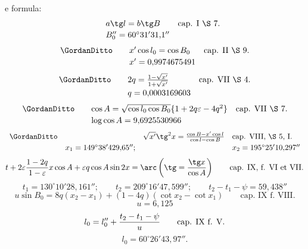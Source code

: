 \begingroup\small
e formula:
\[
\begin{array}{rcll}
&& a\tg l=b\tg B&\text{cap. I \S\ 7.}\vspace{0.2em}\\
&& B_0''=60^\circ31'31{,}1''&
\end{array}
\]
\[
\begin{array}{rcll}
\GordanDitto&& x'\cos l_0=\cos B_0&\text{cap. II \S\ 9.}\vspace{0.2em}\\
&& x'=0{,}9974675491&
\end{array}
\]
\[
\begin{array}{rcll}
\GordanDitto&&2q={1-\sqrt{x'}\over1+\sqrt{x'}}&\text{cap. VII \S\ 4.}\vspace{0.2em}\\
&&q=0{,}0003169603&
\end{array}
\]
\[
\begin{array}{rcll}
\GordanDitto&&\cos A=\sqrt{\cos l_0\cos B_0}\{1+2q\varepsilon-4q^2\}&\text{cap. VII \S\ 7.}\vspace{0.2em}\\
&&\log\cos A=9{,}6925530966&
\end{array}
\]
\[
\begin{array}{rcll}
\GordanDitto&&\sqrt{x'}\tg^2x={\cos B-x'\cos l\over\cos l-\cos B}&\text{cap. VIII, \S\ 5, I.}\vspace{0.2em}\\
&x_1=149^\circ38'429{,}65'';&&x_2=195^\circ25'10{,}297''
\end{array}
\]
\[
 t+2\varepsilon{1-2q\over1-\varepsilon}x\cos A+\varepsilon q\cos A\sin2x
 =\arc\left(\tg={\tg x\over\cos A}\right)
 \qquad\text{cap. IX, f. VI et VII.}
\]
\[
 t_1=130^\circ10'28{,}161'';\qquad t_2=209^\circ16'47{,}599'';\qquad t_2-t_1-\psi=59{,}438''
\]
\[
 u\sin B_0=8q(x_2-x_1)+(1-4q)(\cot x_2-\cot x_1)
 \qquad\text{cap. IX f. VIII.}
\]
\[
 u=6{,}125
\]
\[
 l_0=l_0''+{t_2-t_1-\psi\over u}
 \qquad\text{cap. IX f. V.}
\]
\[
 l_0=60^\circ26'43{,}97''.
\]

\GordanOrnament
\endgroup

